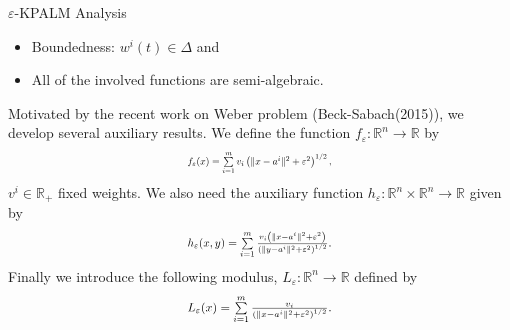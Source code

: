 \documentclass[9pt,handout]{beamer} %
\newenvironment{displaybox}[1]
{
  \centerline\bgroup\hfill
  \begin{beamerboxesrounded}[lower=default,shadow=true,width=#1]{}
}
{
  \end{beamerboxesrounded}\hfill\egroup
}
\newcommand{\rr}{\mathbb{R}} %
\begin{document}
	\begin{frame}{$\varepsilon$-KPALM Analysis}
		\begin{itemize}[<+->]
			\item Boundedness: $w^i(t) \in \Delta$ and \\
			\item All of the involved functions are semi-algebraic.
		\end{itemize}
		\pause
		\begin{displaybox}{11cm}
			Motivated by the recent work on Weber problem {\dblue (Beck-Sabach(2015))}, we develop several auxiliary results. We define the function $f_{\varepsilon}: \mathbb{R}^n \rightarrow \mathbb{R}$ by
			\begin{equation*}
				\resizebox{.3\hsize}{!}{$f_{\varepsilon}(x) = \sum\limits_{i=1}^{m} v_i \left( \|x - a^i\|^2 + {\varepsilon}^2 \right)^{1/2},$}
			\end{equation*}
			$v^i \in \rr_+$ fixed weights. We also need the auxiliary function $h_{\varepsilon}: \mathbb{R}^n \times \mathbb{R}^n \rightarrow \mathbb{R}$ given by
			\begin{equation*}
				\resizebox{.3\hsize}{!}{$h_{\varepsilon}(x,y) = \sum\limits_{i=1}^m \frac{v_i \left( \|x-a^i\|^2 + {\varepsilon}^2 \right)}{\left( \|y-a^i\|^2 + {\varepsilon}^2 \right)^{1/2}}.$}
			\end{equation*}
			Finally we introduce the following modulus, $L_{\varepsilon}: \mathbb{R}^n \rightarrow \mathbb{R}$ defined by
			\begin{equation*}
				\resizebox{.3\hsize}{!}{$L_{\varepsilon}(x) = \sum\limits_{i=1}^{m}\frac{v_i}{\left( \|x - a^i\|^2 + {\varepsilon}^2 \right)^{1/2}}.$}
			\end{equation*}
		\end{displaybox}
	\end{frame}
	
\end{document}

